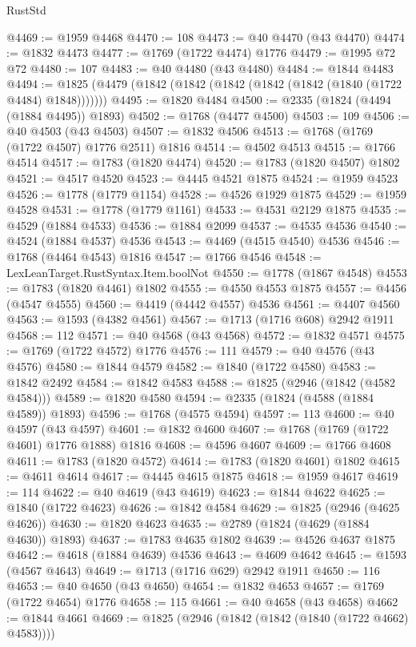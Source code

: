 \begin{lexlean}{RustStd}
\begin{coremodule}
@4469 := @1959 @4468
@4470 := 108
@4473 := @40 @4470 (@43 @4470)
@4474 := @1832 @4473
@4477 := @1769 (@1722 @4474) @1776
@4479 := @1995 @72 @72
@4480 := 107
@4483 := @40 @4480 (@43 @4480)
@4484 := @1844 @4483
@4494 := @1825 (@4479 (@1842 (@1842 (@1842 (@1842 (@1842 (@1840 (@1722 @4484) @1848)))))))
@4495 := @1820 @4484
@4500 := @2335 (@1824 (@4494 (@1884 @4495)) @1893)
@4502 := @1768 (@4477 @4500)
@4503 := 109
@4506 := @40 @4503 (@43 @4503)
@4507 := @1832 @4506
@4513 := @1768 (@1769 (@1722 @4507) @1776 @2511) @1816
@4514 := @4502 @4513
@4515 := @1766 @4514
@4517 := @1783 (@1820 @4474)
@4520 := @1783 (@1820 @4507) @1802
@4521 := @4517 @4520
@4523 := @4445 @4521 @1875
@4524 := @1959 @4523
@4526 := @1778 (@1779 @1154)
@4528 := @4526 @1929 @1875
@4529 := @1959 @4528
@4531 := @1778 (@1779 @1161)
@4533 := @4531 @2129 @1875
@4535 := @4529 (@1884 @4533)
@4536 := @1884 @2099
@4537 := @4535 @4536
@4540 := @4524 (@1884 @4537) @4536
@4543 := @4469 (@4515 @4540) @4536
@4546 := @1768 (@4464 @4543) @1816
@4547 := @1766 @4546
@4548 := LexLeanTarget.RustSyntax.Item.boolNot
@4550 := @1778 (@1867 @4548)
@4553 := @1783 (@1820 @4461) @1802
@4555 := @4550 @4553 @1875
@4557 := @4456 (@4547 @4555)
@4560 := @4419 (@4442 @4557) @4536
@4561 := @4407 @4560
@4563 := @1593 (@4382 @4561)
@4567 := @1713 (@1716 @608) @2942 @1911
@4568 := 112
@4571 := @40 @4568 (@43 @4568)
@4572 := @1832 @4571
@4575 := @1769 (@1722 @4572) @1776
@4576 := 111
@4579 := @40 @4576 (@43 @4576)
@4580 := @1844 @4579
@4582 := @1840 (@1722 @4580)
@4583 := @1842 @2492
@4584 := @1842 @4583
@4588 := @1825 (@2946 (@1842 (@4582 @4584)))
@4589 := @1820 @4580
@4594 := @2335 (@1824 (@4588 (@1884 @4589)) @1893)
@4596 := @1768 (@4575 @4594)
@4597 := 113
@4600 := @40 @4597 (@43 @4597)
@4601 := @1832 @4600
@4607 := @1768 (@1769 (@1722 @4601) @1776 @1888) @1816
@4608 := @4596 @4607
@4609 := @1766 @4608
@4611 := @1783 (@1820 @4572)
@4614 := @1783 (@1820 @4601) @1802
@4615 := @4611 @4614
@4617 := @4445 @4615 @1875
@4618 := @1959 @4617
@4619 := 114
@4622 := @40 @4619 (@43 @4619)
@4623 := @1844 @4622
@4625 := @1840 (@1722 @4623)
@4626 := @1842 @4584
@4629 := @1825 (@2946 (@4625 @4626))
@4630 := @1820 @4623
@4635 := @2789 (@1824 (@4629 (@1884 @4630)) @1893)
@4637 := @1783 @4635 @1802
@4639 := @4526 @4637 @1875
@4642 := @4618 (@1884 @4639) @4536
@4643 := @4609 @4642
@4645 := @1593 (@4567 @4643)
@4649 := @1713 (@1716 @629) @2942 @1911
@4650 := 116
@4653 := @40 @4650 (@43 @4650)
@4654 := @1832 @4653
@4657 := @1769 (@1722 @4654) @1776
@4658 := 115
@4661 := @40 @4658 (@43 @4658)
@4662 := @1844 @4661
@4669 := @1825 (@2946 (@1842 (@1842 (@1840 (@1722 @4662) @4583))))

\end{coremodule}
\end{lexlean}
